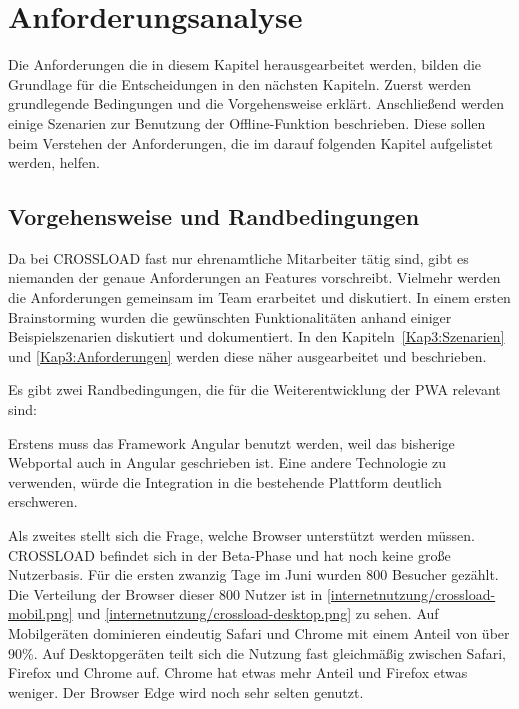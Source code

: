 \chapter{Anforderungsanalyse}
\label{Kap3}
Die Anforderungen die in diesem Kapitel herausgearbeitet werden, bilden die Grundlage für die Entscheidungen in den nächsten Kapiteln. Zuerst werden grundlegende Bedingungen und die Vorgehensweise erklärt. Anschließend werden einige Szenarien zur Benutzung der Offline-Funktion beschrieben. Diese sollen beim Verstehen der Anforderungen, die im darauf folgenden Kapitel aufgelistet werden, helfen.

\section{Vorgehensweise und Randbedingungen}
Da bei CROSSLOAD fast nur ehrenamtliche Mitarbeiter tätig sind, gibt es niemanden der genaue Anforderungen an Features vorschreibt. Vielmehr werden die Anforderungen gemeinsam im Team erarbeitet und diskutiert. In einem ersten Brainstorming wurden die gewünschten Funktionalitäten anhand einiger Beispielszenarien diskutiert und dokumentiert. In den Kapiteln~\ref{Kap3:Szenarien} und \ref{Kap3:Anforderungen} werden diese näher ausgearbeitet und beschrieben.

Es gibt zwei Randbedingungen, die für die Weiterentwicklung der \ac{PWA} relevant sind:

Erstens muss das Framework Angular benutzt werden, weil das bisherige Webportal auch in Angular geschrieben ist. Eine andere Technologie zu verwenden, würde die Integration in die bestehende Plattform deutlich erschweren. 

Als zweites stellt sich die Frage, welche Browser unterstützt werden müssen. CROSSLOAD befindet sich in der Beta-Phase und hat noch keine große Nutzerbasis. Für die ersten zwanzig Tage im Juni wurden 800 Besucher gezählt. Die Verteilung der Browser dieser 800 Nutzer ist in \autoref{internetnutzung/crossload-mobil.png} und \autoref{internetnutzung/crossload-desktop.png} zu sehen. Auf Mobilgeräten dominieren eindeutig Safari und Chrome mit einem Anteil von über 90\%. Auf Desktopgeräten teilt sich die Nutzung fast gleichmäßig zwischen Safari, Firefox und Chrome auf. Chrome hat etwas mehr Anteil und Firefox etwas weniger. Der Browser Edge wird noch sehr selten genutzt.


